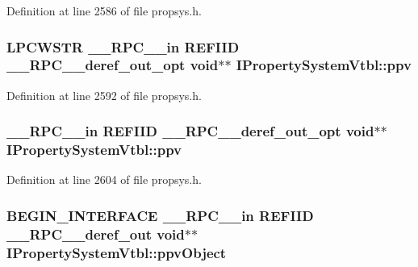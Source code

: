 Definition at line 2586 of file propsys.\+h.

\subsubsection[{\texorpdfstring{ppv}{ppv}}]{ {\bf L\+P\+C\+W\+S\+TR} {\bf \+\_\+\+\_\+\+R\+P\+C\+\_\+\+\_\+in} {\bf R\+E\+F\+I\+ID} {\bf \+\_\+\+\_\+\+R\+P\+C\+\_\+\+\_\+deref\+\_\+out\+\_\+opt} {\bf void}$\ast$$\ast$ I\+Property\+System\+Vtbl\+::ppv}\hypertarget{struct_i_property_system_vtbl_a529da17ef7eda2ad094c279423f12270}{}\label{struct_i_property_system_vtbl_a529da17ef7eda2ad094c279423f12270}


Definition at line 2592 of file propsys.\+h.

\subsubsection[{\texorpdfstring{ppv}{ppv}}]{ {\bf \+\_\+\+\_\+\+R\+P\+C\+\_\+\+\_\+in} {\bf R\+E\+F\+I\+ID} {\bf \+\_\+\+\_\+\+R\+P\+C\+\_\+\+\_\+deref\+\_\+out\+\_\+opt} {\bf void}$\ast$$\ast$ I\+Property\+System\+Vtbl\+::ppv}\hypertarget{struct_i_property_system_vtbl_a4991051c6b7e532c92d06614f6ad6053}{}\label{struct_i_property_system_vtbl_a4991051c6b7e532c92d06614f6ad6053}


Definition at line 2604 of file propsys.\+h.

\subsubsection[{\texorpdfstring{ppv\+Object}{ppvObject}}]{\setlength{\rightskip}{0pt plus 5cm}B\+E\+G\+I\+N\+\_\+\+I\+N\+T\+E\+R\+F\+A\+CE {\bf \+\_\+\+\_\+\+R\+P\+C\+\_\+\+\_\+in} {\bf R\+E\+F\+I\+ID} {\bf \+\_\+\+\_\+\+R\+P\+C\+\_\+\+\_\+deref\+\_\+out} {\bf void}$\ast$$\ast$ I\+Property\+System\+Vtbl\+::ppv\+Object}\hypertarget{struct_i_property_system_vtbl_a89b4b62c97acc18fe37a782b344a112d}{}\label{struct_i_property_system_vtbl_a89b4b62c97acc18fe37a782b344a112d}



